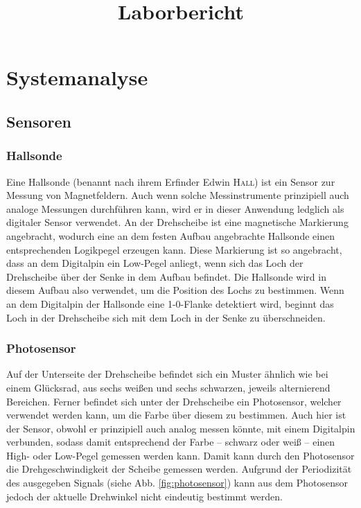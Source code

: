 \documentclass{kis}
\title{Laborbericht}
\begin{document}
\maketitle
{}
\setcounter{tocdepth}{2}
\tableofcontents
\listoffigures
\clearpage
{}

\section{Systemanalyse}

\subsection{Sensoren}
\subsubsection{Hallsonde} 
Eine Hallsonde (benannt nach ihrem Erfinder Edwin \textsc{Hall}) ist ein Sensor zur Messung von Magnetfeldern. Auch wenn solche Messinstrumente prinzipiell auch analoge Messungen durchführen kann, wird er in dieser Anwendung ledglich als digitaler Sensor verwendet. An der Drehscheibe ist eine magnetische Markierung angebracht, wodurch eine an dem festen Aufbau angebrachte Hallsonde einen entsprechenden Logikpegel erzeugen kann. Diese Markierung ist so angebracht, dass an dem Digitalpin ein Low-Pegel anliegt, wenn sich das Loch der Drehscheibe über der Senke in dem Aufbau befindet.  Die Hallsonde wird in diesem Aufbau also verwendet, um die Position des Lochs zu bestimmen. Wenn an dem Digitalpin der Hallsonde eine 1-0-Flanke detektiert wird, beginnt das Loch in der Drehscheibe sich mit dem Loch in der Senke zu überschneiden.

\subsubsection{Photosensor}
Auf der Unterseite der Drehscheibe befindet sich ein Muster ähnlich wie bei einem Glücksrad, aus sechs weißen und sechs schwarzen, jeweils alternierend Bereichen. Ferner befindet sich unter der Drehscheibe ein Photosensor, welcher verwendet werden kann, um die Farbe über diesem zu bestimmen. Auch hier ist der Sensor, obwohl er prinzipiell auch analog messen könnte, mit einem Digitalpin verbunden, sodass damit entsprechend der Farbe -- schwarz oder weiß -- einen High- oder Low-Pegel gemessen werden kann. Damit kann durch den Photosensor die Drehgeschwindigkeit der Scheibe gemessen werden. Aufgrund der Periodizität des ausgegeben Signals (siehe Abb. \ref{fig:photosensor}) kann aus dem Photosensor jedoch der aktuelle Drehwinkel nicht eindeutig bestimmt werden.
\end{document}

